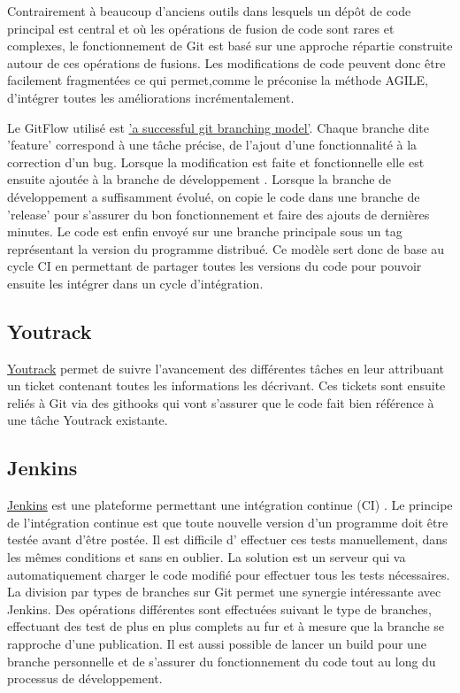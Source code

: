 \documentclass[french,a4paper,12pt]{report}
\begin{document}
Contrairement à beaucoup d'anciens outils dans lesquels un dépôt de code principal est central et où les opérations de fusion de code sont rares et complexes, le fonctionnement de Git est basé sur une approche répartie construite autour de ces opérations de fusions. Les modifications de code peuvent donc être facilement fragmentées ce qui permet,comme le préconise la méthode AGILE, d'intégrer toutes les améliorations incrémentalement. 

Le GitFlow utilisé est \href{https://nvie.com/posts/a-successful-git-branching-model/}{'a successful git branching model'}. Chaque branche dite 'feature' correspond à une tâche précise, de l'ajout d'une fonctionnalité à la correction d'un bug. Lorsque la modification est faite et fonctionnelle elle est ensuite ajoutée à la branche de développement . Lorsque la branche de développement a suffisamment évolué, on copie le code dans une branche de 'release' pour s'assurer du bon fonctionnement et faire des ajouts de dernières minutes. Le code est enfin envoyé sur une branche principale sous un tag représentant la version du programme distribué.
Ce modèle sert donc de base au cycle CI en permettant de partager toutes les versions du code pour pouvoir ensuite les intégrer dans un cycle d'intégration.

\subsection{Youtrack}

\href{https://www.jetbrains.com/youtrack/}{Youtrack} permet de suivre l'avancement des différentes tâches en leur attribuant un ticket contenant toutes les informations les décrivant.
Ces tickets sont ensuite reliés à Git via des githooks qui vont s'assurer que le code fait bien référence à une tâche Youtrack existante.

\subsection{Jenkins}

\href{https://www.jenkins.io/}{Jenkins} est une plateforme permettant une intégration continue (CI) . Le principe de l’intégration continue est que toute nouvelle version d’un programme doit être testée avant d’être postée. Il est difficile d' effectuer ces tests manuellement, dans les mêmes conditions et sans en oublier. La solution est un serveur qui va automatiquement charger le code modifié pour effectuer tous les tests nécessaires. La division par types de branches sur Git permet une synergie intéressante avec Jenkins. Des opérations différentes sont effectuées suivant le type de branches, effectuant des test de plus en plus complets au fur et à mesure que la branche se rapproche d'une publication. Il est aussi possible de lancer un build pour une branche personnelle et de s’assurer du fonctionnement du code tout au long du processus de développement.
\end{document}
